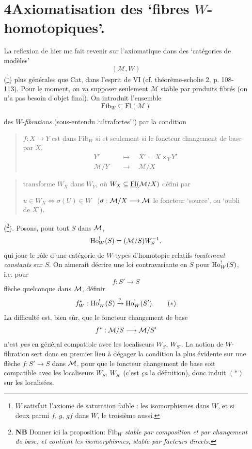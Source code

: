 \section*{4\quad Axiomatisation des ‘fibres $W$-homotopiques’.}

La reflexion de hier me fait revenir sur l'axiomatique dans des ‘catégories de modèles’ %
\[
(\mathcal{M}, W)
\]
(\footnote[119]{$W$ satisfait l'axiome de saturation faible : les isomorphismes dans $W$, et si deux parmi $f$, $g$, $gf$ dans $W$, le troisième aussi.}) plus générales que Cat, dans l'esprit de VI (cf. théorème-scholie 2, p. 108-113). Pour le moment, on va supposer seulement $\mathcal{M}$ stable par produits fibrés (on n'a pas besoin d'objet final). On introduit l'ensemble
\[
\mathrm{Fib}_W \subseteq \mathrm{Fl}(\mathcal{M})
\]

des \textit{$W$-fibrations} (sous-entendu ‘ultrafortes’!) par la condition

\begin{quote}
$f : X \longrightarrow Y$ est dans $\mathrm{Fib}_W$ si et seulement si le foncteur changement de base par $X$,
\[
\begin{aligned}
Y' &\quad\longmapsto\quad X' = X \times_Y Y' \\
\mathcal{M}/Y &\quad\longrightarrow\quad \mathcal{M}/X
\end{aligned}
\]
\end{quote}


\begin{quote}
transforme $W_X$ dans $W_Y$, où $W_X \subseteq \underline{\mathrm{Fl}}(\mathcal{M}/X)$ défini par

$u \in W_X \iff \sigma(U) \in W$ \ ($\sigma : \mathcal{M}/X \longrightarrow \mathcal{M}$ le foncteur ‘source’, ou ‘oubli de $X$’). %
\end{quote}

(\footnote[120]{\textbf{NB} Donner ici la proposition: $\mathrm{Fib}_W$ \textit{stable par composition et par changement de base, et contient les isomorphismes, stable par facteurs directs.}}). Posons, pour tout $S$ dans $\mathcal{M}$,
\[
\mathrm{Ho}^!_W(S) = (\mathcal{M}/S)W_S^{-1},
\]
qui joue le rôle d'une catégorie de $W$-types d'homotopie relatifs \textit{localement constants} sur $S$. On aimerait décrire une loi contravariante en $S$ pour $\mathrm{Ho}^!_W(S)$, i.e. pour
\[
f : S' \longrightarrow S
\]
flèche quelconque dans $\mathcal{M}$, définir
\[
f^*_W : \mathrm{Ho}^!_W(S) \xrightarrow{?} \mathrm{Ho}^!_W(S'). \tag*{$(*)$}
\]
La difficulté est, bien sûr, que le foncteur changement de base
\[
f^* : \mathcal{M}/S \longrightarrow \mathcal{M}/S'
\]
n'est \textit{pas} en général compatible avec les  localiseurs $W_S$, $W_{S'}$. La notion de $W$-fibration sert donc en premier lieu à dégager la condition la plus évidente sur une flèche $f : S' \longrightarrow S$ dans $\mathcal{M}$, pour que le foncteur changement de base soit compatible avec les localiseurs $W_S$, $W_{S'}$ (c'est \textit{ça} la définition), donc induit $(*)$ sur les localisées.

